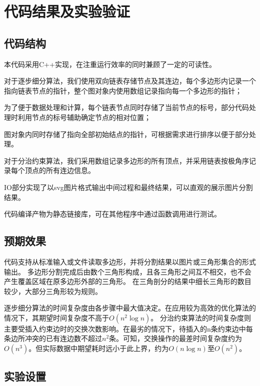 
\chapter{代码结果及实验验证}

\section{代码结构}

本代码采用C++实现，在注重运行效率的同时兼顾了一定的可读性。

对于逐步细分算法，我们使用双向链表存储节点及其连边，每个多边形内记录一个指向链表节点的指针，整个图对象内使用数组记录指向每一个多边形的指针；

为了便于数据处理和计算，每个链表节点同时存储了当前节点的标号，部分代码处理时利用节点的标号辅助确定节点的相对位置；

图对象内同时存储了指向全部初始结点的指针，可根据需求进行排序以便于部分处理。

对于分治约束算法，我们采用数组记录多边形的所有顶点，并采用链表按极角序记录每个顶点的所有连边信息。

IO部分实现了以svg图片格式输出中间过程和最终结果，可以直观的展示图片分割结果。

代码编译产物为静态链接库，可在其他程序中通过函数调用进行测试。

\section{预期效果}
代码支持从标准输入或文件读取多边形，并将分割结果以图片或三角形集合的形式输出。
多边形分割完成后由数个三角形构成，且各三角形之间互不相交，也不会产生覆盖区域在原多边形外部的三角形。
在三角剖分的结果中细长三角形的数目较少，大部分三角形较为规则。

逐步细分算法的时间复杂度由各步骤中最大值决定。在应用较为高效的优化算法的情况下，其期望时间复杂度不高于\(O(n^2\log n)\)。
分治约束算法的时间复杂度则主要受插入约束边时的交换次数影响。在最劣的情况下，待插入的n条约束边中每条边所冲突的已有连边数不超过\(n^2\)条。可知，交换操作的最差时间复杂度约为\(O(n^3)\)。但实际数据中期望耗时远小于此上界，约为\(O( n\log n)\)至\(O(n^2)\)。
\section{实验设置}

